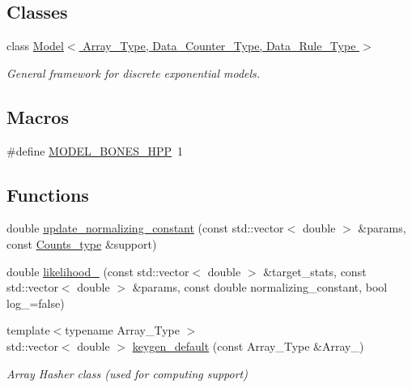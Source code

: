 \subsection*{Classes}
\begin{DoxyCompactItemize}
\item 
class \hyperlink{class_model}{Model$<$ Array\+\_\+\+Type, Data\+\_\+\+Counter\+\_\+\+Type, Data\+\_\+\+Rule\+\_\+\+Type $>$}
\begin{DoxyCompactList}\small\item\em General framework for discrete exponential models. \end{DoxyCompactList}\end{DoxyCompactItemize}
\subsection*{Macros}
\begin{DoxyCompactItemize}
\item 
\#define \hyperlink{barry_8hpp_a96ab9fc3cc62974a71e056d8d86a83e1}{M\+O\+D\+E\+L\+\_\+\+B\+O\+N\+E\+S\+\_\+\+H\+PP}~1
\end{DoxyCompactItemize}
\subsection*{Functions}
\begin{DoxyCompactItemize}
\item 
double \hyperlink{model-bones_8hpp_a557368a4713ccf9ee1867c1bd17d58ba}{update\+\_\+normalizing\+\_\+constant} (const std\+::vector$<$ double $>$ \&params, const \hyperlink{typedefs_8hpp_aee40fa17c1fddb63dd1f2b1470ade95b}{Counts\+\_\+type} \&support)
\item 
double \hyperlink{model-bones_8hpp_a30867af87b732210c25b5148a8909454}{likelihood\+\_\+} (const std\+::vector$<$ double $>$ \&target\+\_\+stats, const std\+::vector$<$ double $>$ \&params, const double normalizing\+\_\+constant, bool log\+\_\+=false)
\item 
{\footnotesize template$<$typename Array\+\_\+\+Type $>$ }\\std\+::vector$<$ double $>$ \hyperlink{model-bones_8hpp_ac8a92bc92bfb721602c0470f3efa4f84}{keygen\+\_\+default} (const Array\+\_\+\+Type \&Array\+\_\+)
\begin{DoxyCompactList}\small\item\em Array Hasher class (used for computing support) \end{DoxyCompactList}\end{DoxyCompactItemize}



